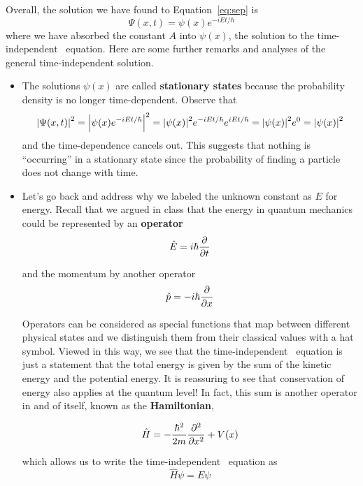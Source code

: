 Overall, the solution we have found to Equation~\ref{eq:sep} is
\begin{equation}
	\Psi(x,t) = \psi(x)e^{-iEt/\hbar}
\end{equation}
where we have absorbed the constant $A$ into $\psi(x)$, the solution to the time-independent \Sch\ equation. Here are some further remarks and analyses of the general time-independent solution.
\begin{itemize}
	\item The solutions $\psi(x)$ are called \textbf{stationary states} because the probability density is no longer time-dependent. Observe that 
	\begin{equation*}
		\abs{\Psi(x,t)}^2 = \abs{\psi(x)e^{-iEt/\hbar}}^2 = \abs{\psi(x)}^2e^{-iEt/\hbar}e^{iEt/\hbar} = \abs{\psi(x)}^2e^0 = \abs{\psi(x)}^2
	\end{equation*}
	and the time-dependence cancels out. This suggests that nothing is ``occurring'' in a stationary state since the probability of finding a particle does not change with time.
	
	\item Let's go back and address why we labeled the unknown constant as $E$ for energy. Recall that we argued in class that the energy in quantum mechanics could be represented by an \textbf{operator} 
	\begin{equation}
		\hat{E} = i\hbar\pdv{t} \label{eq:Eop}
	\end{equation}
	
	and the momentum by another operator 
	\begin{equation}
		\hat{p} = -i\hbar\pdv{x} \label{eq:Pop}
	\end{equation}
	
	Operators can be considered as special functions that map between different physical states and we distinguish them from their classical values with a hat symbol. Viewed in this way, we see that the time-independent \Sch\ equation is just a statement that the total energy is given by the sum of the kinetic energy and the potential energy. It is reassuring to see that conservation of energy also applies at the quantum level! In fact, this sum is another operator in and of itself, known as the \textbf{Hamiltonian},
	\begin{tcolorbox}[title = Hamiltonian operator] \vspace{-2ex}
		\begin{equation}
		\hat{H} = -\frac{\hbar^2}{2m}\pdv[2]{x}+V(x) \label{eq:ham}
		\end{equation}
	\end{tcolorbox}
	which allows us to write the time-independent \Sch\ equation as
	\begin{equation}
		\hat{H}\psi = E\psi \label{eq:tise-ham}
	\end{equation}
	

\end{itemize}
